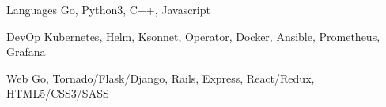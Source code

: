 

\begin{cvskills}

  \cvskill
    {Languages} %
    {Go, Python3, C++, Javascript} %

  \cvskill
    {DevOp} %
    {Kubernetes, Helm, Ksonnet, Operator, Docker, Ansible, Prometheus, Grafana} %

  \cvskill
    {Web} %
    {Go, Tornado/Flask/Django, Rails, Express, React/Redux, HTML5/CSS3/SASS} %

\end{cvskills}
